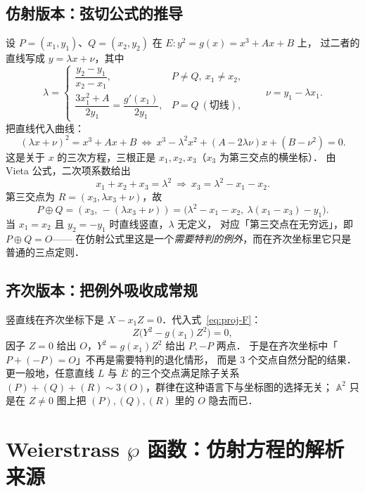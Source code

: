 \documentclass[10pt,a4paper]{article}
\numberwithin{equation}{section}
\begin{document}
\subsection{仿射版本：弦切公式的推导}

设 $P=(x_{1},y_{1})$、$Q=(x_{2},y_{2})$ 在 $E:y^{2}=g(x)=x^{3}+Ax+B$ 上，
过二者的直线写成 $y=\lambda x+\nu$，其中
\begin{equation}\label{eq:lambda}
\lambda=
\begin{cases}
\dfrac{y_{2}-y_{1}}{x_{2}-x_{1}}, & P\neq Q,\ x_{1}\neq x_{2},\\[3mm]
\dfrac{3x_{1}^{2}+A}{2y_{1}}=\dfrac{g'(x_{1})}{2y_{1}}, & P=Q\ (\text{切线}),
\end{cases}
\qquad \nu=y_{1}-\lambda x_{1}.
\end{equation}
把直线代入曲线：
\[
(\lambda x+\nu)^{2}=x^{3}+Ax+B
\ \Longleftrightarrow\
x^{3}-\lambda^{2}x^{2}+(A-2\lambda\nu)x+(B-\nu^{2})=0 .
\]
这是关于 $x$ 的三次方程，三根正是 $x_{1},x_{2},x_{3}$（$x_{3}$ 为第三交点的横坐标）．
由 Vieta 公式，二次项系数给出
\[
x_{1}+x_{2}+x_{3}=\lambda^{2}\ \Longrightarrow\ x_{3}=\lambda^{2}-x_{1}-x_{2}.
\]
第三交点为 $R=(x_{3},\lambda x_{3}+\nu)$，故
\begin{equation}\label{eq:addition-affine}
P\oplus Q=(x_{3},\,-(\lambda x_{3}+\nu))
        =\bigl(\lambda^{2}-x_{1}-x_{2},\ \lambda(x_{1}-x_{3})-y_{1}\bigr).
\end{equation}
当 $x_{1}=x_{2}$ 且 $y_{2}=-y_{1}$ 时直线竖直，$\lambda$ 无定义，
对应「第三交点在无穷远」，即 $P\oplus Q=O$——
在仿射公式里这是一个\emph{需要特判的例外}，而在齐次坐标里它只是普通的三点定则．

\subsection{齐次版本：把例外吸收成常规}

竖直线在齐次坐标下是 $X-x_{1}Z=0$．代入式~\eqref{eq:proj-F}：
\[
Z\bigl(Y^{2}-g(x_{1})Z^{2}\bigr)=0,
\]
因子 $Z=0$ 给出 $O$，$Y^{2}=g(x_{1})Z^{2}$ 给出 $P,-P$ 两点．
于是在齐次坐标中「$P+(-P)=O$」不再是需要特判的退化情形，
而是 $3$ 个交点自然分配的结果．
更一般地，任意直线 $L$ 与 $\overline E$ 的三个交点满足除子关系
$(P)+(Q)+(R)\sim 3(O)$，群律在这种语言下与坐标图的选择无关；
$\mathbb A^{2}$ 只是在 $Z\neq0$ 图上把 $(P),(Q),(R)$ 里的 $O$ 隐去而已．

\appendix

\section{Weierstrass $\wp$ 函数：仿射方程的解析来源}
\end{document}
